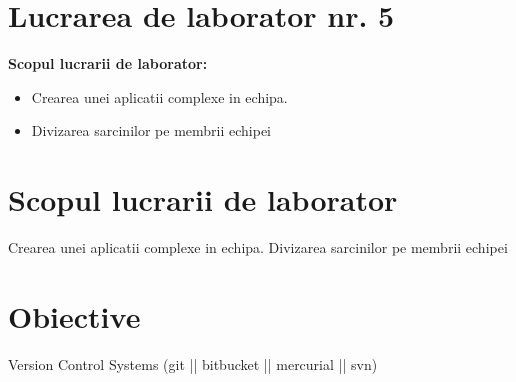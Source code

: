 \section*{Lucrarea de laborator nr. 5}

\textbf{Scopul lucrarii de laborator:}
\begin{itemize}
\item Crearea unei aplicatii complexe in echipa.
\item Divizarea sarcinilor pe membrii echipei
\end{itemize}

\section{Scopul lucrarii de laborator}
Crearea unei aplicatii complexe in echipa.
Divizarea sarcinilor pe membrii echipei
\section{Obiective}

Version Control Systems (git || bitbucket || mercurial || svn)

